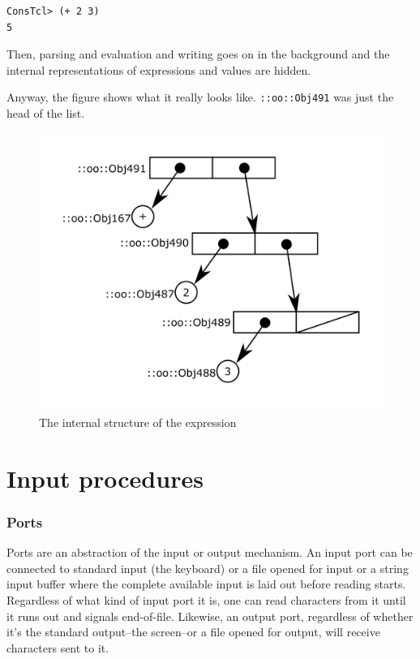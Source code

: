 \documentclass[a5paper,draft]{memoir}
\begin{document}
\begin{verbatim}
ConsTcl> (+ 2 3)
5
\end{verbatim}

Then, parsing and evaluation and writing goes on in the background and the internal representations of expressions and values are hidden.

Anyway, the figure shows what it really looks like. \texttt{::oo::Obj491} was just the head of the list.

\begin{figure}[h!]\includegraphics{images/intreplist.png}\captionsetup{labelformat=empty}\caption{The internal structure of the expression}\label{fig:the-internal-structure-of-the-expression}\end{figure}

\section{Input procedures}
\label{input-procedures}

\begin{pulledtext}

\subsubsection{Ports}
\label{ports}

Ports are an abstraction of the input or output mechanism. An input port can be connected to standard input (the keyboard) or a file opened for input or a string input buffer where the complete available input is laid out before reading starts. Regardless of what kind of input port it is, one can read characters from it until it runs out and signals end-of-file. Likewise, an output port, regardless of whether it's the standard output--the screen--or a file opened for output, will receive characters sent to it.
\end{pulledtext}
\end{document}

